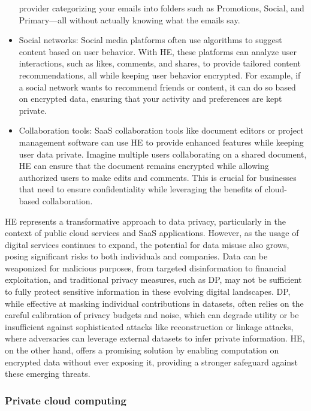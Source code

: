 \documentclass[
  letterpaper,
  DIV=11,
  numbers=noendperiod,
  oneside]{scrartcl}
\begin{document}
\begin{itemize}
  provider categorizing your emails into folders such as Promotions,
  Social, and Primary---all without actually knowing what the emails
  say.
\item
  Social networks: Social media platforms often use algorithms to
  suggest content based on user behavior. With HE, these platforms can
  analyze user interactions, such as likes, comments, and shares, to
  provide tailored content recommendations, all while keeping user
  behavior encrypted. For example, if a social network wants to
  recommend friends or content, it can do so based on encrypted data,
  ensuring that your activity and preferences are kept private.
\item
  Collaboration tools: SaaS collaboration tools like document editors or
  project management software can use HE to provide enhanced features
  while keeping user data private. Imagine multiple users collaborating
  on a shared document, HE can ensure that the document remains
  encrypted while allowing authorized users to make edits and comments.
  This is crucial for businesses that need to ensure confidentiality
  while leveraging the benefits of cloud-based collaboration.
\end{itemize}

HE represents a transformative approach to data privacy, particularly in
the context of public cloud services and SaaS applications. However, as
the usage of digital services continues to expand, the potential for
data misuse also grows, posing significant risks to both individuals and
companies. Data can be weaponized for malicious purposes, from targeted
disinformation to financial exploitation, and traditional privacy
measures, such as DP, may not be sufficient to fully protect sensitive
information in these evolving digital landscapes. DP, while effective at
masking individual contributions in datasets, often relies on the
careful calibration of privacy budgets and noise, which can degrade
utility or be insufficient against sophisticated attacks like
reconstruction or linkage attacks, where adversaries can leverage
external datasets to infer private information. HE, on the other hand,
offers a promising solution by enabling computation on encrypted data
without ever exposing it, providing a stronger safeguard against these
emerging threats.

\subsubsection{Private cloud computing}\label{private-cloud-computing}
\end{document}
